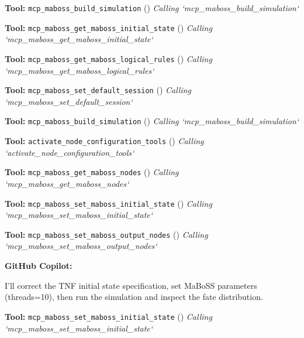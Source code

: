 \documentclass[11pt,a4paper]{article}
\begin{document}
\begin{toolokbox}
\textbf{Tool:} \texttt{mcp\_maboss\_build\_simulation} (\checkmark)
\textit{Calling `mcp\_maboss\_build\_simulation`}
\end{toolokbox}
\begin{toolokbox}
\textbf{Tool:} \texttt{mcp\_maboss\_get\_maboss\_initial\_state} (\checkmark)
\textit{Calling `mcp\_maboss\_get\_maboss\_initial\_state`}
\end{toolokbox}
\begin{toolokbox}
\textbf{Tool:} \texttt{mcp\_maboss\_get\_maboss\_logical\_rules} (\checkmark)
\textit{Calling `mcp\_maboss\_get\_maboss\_logical\_rules`}
\end{toolokbox}
\begin{toolokbox}
\textbf{Tool:} \texttt{mcp\_maboss\_set\_default\_session} (\checkmark)
\textit{Calling `mcp\_maboss\_set\_default\_session`}
\end{toolokbox}
\begin{toolokbox}
\textbf{Tool:} \texttt{mcp\_maboss\_build\_simulation} (\checkmark)
\textit{Calling `mcp\_maboss\_build\_simulation`}
\end{toolokbox}
\begin{toolokbox}
\textbf{Tool:} \texttt{activate\_node\_configuration\_tools} (\checkmark)
\textit{Calling `activate\_node\_configuration\_tools`}
\end{toolokbox}
\begin{toolokbox}
\textbf{Tool:} \texttt{mcp\_maboss\_get\_maboss\_nodes} (\checkmark)
\textit{Calling `mcp\_maboss\_get\_maboss\_nodes`}
\end{toolokbox}
\begin{toolokbox}
\textbf{Tool:} \texttt{mcp\_maboss\_set\_maboss\_initial\_state} (\checkmark)
\textit{Calling `mcp\_maboss\_set\_maboss\_initial\_state`}
\end{toolokbox}
\begin{toolokbox}
\textbf{Tool:} \texttt{mcp\_maboss\_set\_maboss\_output\_nodes} (\checkmark)
\textit{Calling `mcp\_maboss\_set\_maboss\_output\_nodes`}
\end{toolokbox}
\begin{copilotbox}
\textbf{GitHub Copilot:}

I’ll correct the TNF initial state specification, set MaBoSS parameters (threads=10), then run the simulation and inspect the fate distribution.

\end{copilotbox}
\begin{toolokbox}
\textbf{Tool:} \texttt{mcp\_maboss\_set\_maboss\_initial\_state} (\checkmark)
\textit{Calling `mcp\_maboss\_set\_maboss\_initial\_state`}
\end{toolokbox}
\end{document}
